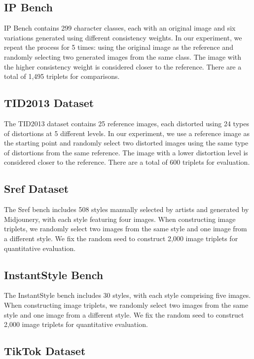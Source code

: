 \subsection{IP Bench}

IP Bench contains 299 character classes, each with an original image and six variations generated using different consistency weights. In our experiment, we repeat the process for 5 times: using the original image as the reference and randomly selecting two generated images from the same class. The image with the higher consistency weight is considered closer to the reference. There are a total of 1,495 triplets for comparisons.

\subsection{TID2013 Dataset}

The TID2013 dataset contains 25 reference images, each distorted using 24 types of distortions at 5 different levels. In our experiment, we use a reference image as the starting point and randomly select two distorted images using the same type of distortions from the same reference. The image with a lower distortion level is considered closer to the reference. There are a total of 600 triplets for evaluation.

\subsection{Sref Dataset}

The Sref bench includes 508 styles manually selected by artists and generated by Midjounery, with each style featuring four images. When constructing image triplets, we randomly select two images from the same style and one image from a different style. We fix the random seed to construct 2,000 image triplets for quantitative evaluation.

\subsection{InstantStyle Bench}
The InstantStyle bench includes 30 styles, with each style comprising five images. When constructing image triplets, we randomly select two images from the same style and one image from a different style. We fix the random seed to construct 2,000 image triplets for quantitative evaluation.


\subsection{TikTok Dataset}

